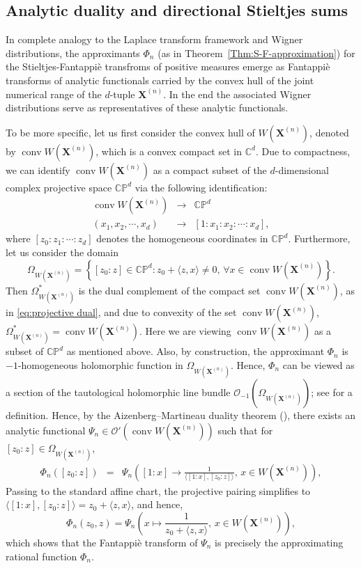 \documentclass[11pt,reqno]{amsart}
\theoremstyle{plain}
\theoremstyle{definition}
\numberwithin{equation}{section}
\newcommand{\C}{\mathbb{C}}
\newcommand{\ltt}{\left(}
\newcommand{\rtt}{\right)}
\newcommand{\beas}{\begin{eqnarray*}}
\newcommand{\eeas}{\end{eqnarray*}}
\begin{document}
        \vspace{2mm}
        
\subsection{Analytic duality and directional Stieltjes sums}\label{sub:analytic dual}
In complete analogy to the Laplace transform framework and Wigner distributions, the approximants $\Phi_n$ (as in Theorem~\ref{Thm:S-F-approximation}) for the Stieltjes-Fantappi\`e transfroms of positive measures 
emerge as Fantappi{\`e} transforms of analytic functionals carried by the convex hull of the joint numerical range of the $d$-tuple $\mathbf{X}^{(n)}$.
In the end the associated Wigner distributions serve as representatives of these analytic functionals.

 To be more specific, let us first consider the convex hull of $W(\mathbf{X}^{(n)})$, denoted by $\operatorname{conv} W(\mathbf{X}^{(n)})$, which is a convex compact set in $\C^d$. Due to compactness, we can identify $\operatorname{conv} W(\mathbf{X}^{(n)})$ as a compact subset of the $d$-dimensional complex projective space $\C\mathbb P^d$ via the following identification:
  \beas
  \operatorname{conv} W(\mathbf{X}^{(n)})&\rightarrow& \C\mathbb P^d\\
  (x_1,x_2,\cdots,x_d)&\rightarrow& [1:x_1:x_2:\cdots:x_d],
  \eeas
  where $[z_0:z_1:\cdots:z_d]$ denotes the homogeneous coordinates in $\C\mathbb P^d$. 
  Furthermore, let us consider the domain
  \[
\Omega_{W(\mathbf{X}^{(n)})}=\left\{[z_0:z]\in\C\mathbb P^{d}: z_0+\langle z, x\rangle\neq 0,\, \forall x\in \operatorname{conv} W(\mathbf{X}^{(n)}) \right\}.
  \]
  Then $\Omega_{W(\mathbf{X}^{(n)})}^*$ is the dual complement of the compact set $\operatorname{conv}W(\mathbf{X}^{(n)})$, as in \eqref{eq:projective dual}, and due to convexity of the set $\operatorname{conv}W(\mathbf{X}^{(n)})$, $\Omega_{W(\mathbf{X}^{(n)})}^*=\operatorname{conv}W(\mathbf{X}^{(n)})$. Here we are viewing $\operatorname{conv}W(\mathbf{X}^{(n)})$ as a subset of $\C\mathbb P^d$ as mentioned above. Also, by construction, the approximant $\Phi_n$ is $-1$-homogeneous holomorphic function in $\Omega_{W(\mathbf{X}^{(n)})}$. Hence, $\Phi_n$ can be viewed as a section of the tautological holomorphic line bundle $\mathcal O_{-1}\ltt\Omega_{W(\mathbf{X}^{(n)})}\rtt$; see \cite[Section~3.2]{Andersson Passare book} for a definition. Hence, by the Aizenberg--Martineau duality theorem (\cite[Theorem~3.5.3]{Andersson Passare book}), there exists an analytic functional $\Psi_{n}\in\mathcal O'(\operatorname{conv} W(\mathbf{X}^{(n)}))$ such that for $[z_0:z]\in \Omega_{W(\mathbf{X}^{(n)})}$,
\beas
\Phi_n([z_0:z])&=&\Psi_n\ltt[1:x]\rightarrow\frac{1}{\langle [1:x],[z_0:z]\rangle },\,x\in W(\mathbf{X}^{(n)})\rtt,
\eeas
Passing to the standard affine chart, the projective pairing simplifies to $ \langle [1:x],[z_0:z]\rangle = z_0 + \langle z,x\rangle$, and hence,
$$
\Phi_n(z_0,z) = \Psi_n \left( x \mapsto \frac{1}{z_0 + \langle z,x\rangle},\,x\in W(\mathbf{X}^{(n)}) \right),
$$
which shows that the Fantappi{\`e} transform of $\Psi_n$ is precisely the approximating rational function $\Phi_n$.
\end{document}
